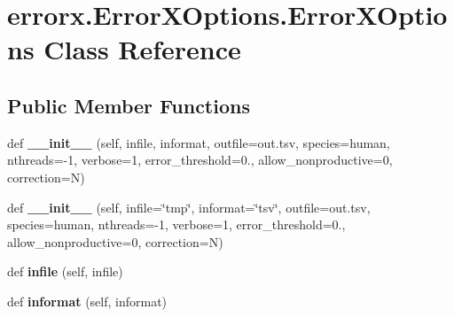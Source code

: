 \hypertarget{classerrorx_1_1_error_x_options_1_1_error_x_options}{}\section{errorx.\+Error\+X\+Options.\+Error\+X\+Options Class Reference}
\label{classerrorx_1_1_error_x_options_1_1_error_x_options}
\subsection*{Public Member Functions}
\begin{DoxyCompactItemize}
\item 
\mbox{\label{classerrorx_1_1_error_x_options_1_1_error_x_options_a5d911f5f02ea6b695b08ba98259a25f3}} 
def {\bfseries \+\_\+\+\_\+init\+\_\+\+\_\+} (self, infile, informat, outfile=\textquotesingle{}out.\+tsv\textquotesingle{}, species=\textquotesingle{}human\textquotesingle{}, nthreads=-\/1, verbose=1, error\+\_\+threshold=0., allow\+\_\+nonproductive=0, correction=\textquotesingle{}N\textquotesingle{})
\item 
\mbox{\label{classerrorx_1_1_error_x_options_1_1_error_x_options_a3d88a74716fdc0c9b37cf6c918f73365}} 
def {\bfseries \+\_\+\+\_\+init\+\_\+\+\_\+} (self, infile=\char`\"{}tmp\char`\"{}, informat=\char`\"{}tsv\char`\"{}, outfile=\textquotesingle{}out.\+tsv\textquotesingle{}, species=\textquotesingle{}human\textquotesingle{}, nthreads=-\/1, verbose=1, error\+\_\+threshold=0., allow\+\_\+nonproductive=0, correction=\textquotesingle{}N\textquotesingle{})
\item 
\mbox{\label{classerrorx_1_1_error_x_options_1_1_error_x_options_a7aec7453a897761ef14999f6dff7daa2}} 
def {\bfseries infile} (self, infile)
\item 
\mbox{\label{classerrorx_1_1_error_x_options_1_1_error_x_options_affb11d98eda94bb6cfa7a85173f06da2}} 
def {\bfseries informat} (self, informat)
\item 
\mbox{\label{classerrorx_1_1_error_x_options_1_1_error_x_options_aabdbf79a074c2eb2b3a9541a037d4514}} 

\end{DoxyCompactItemize}
